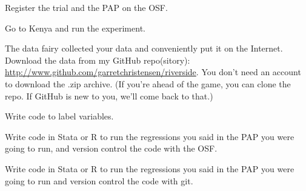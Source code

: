 \documentclass[addpoints,10pt]{exam}
\begin{document}
\begin{questions}

\question
Register the trial and the PAP on the OSF. 

\question 
Go to Kenya and run the experiment.
 
\question
The data fairy collected your data and conveniently put it on the Internet. Download the data from my GitHub repo(sitory): \url{http://www.github.com/garretchristensen/riverside}. You don't need an account to download the .zip archive. (If you're ahead of the game, you can clone the repo. If GitHub is new to you, we'll come back to that.)

\question 
Write code to label variables.

\question
Write code in Stata or R to run the regressions you said in the PAP you were going to run, and version control the code with the OSF.

\question
Write code in Stata or R to run the regressions you said in the PAP you were going to run and version control the code with git.
\end{questions}
\end{document}
